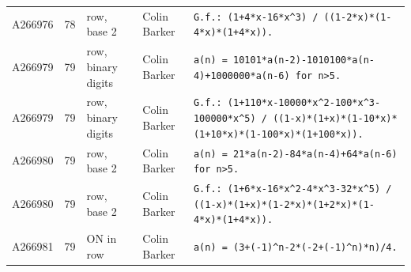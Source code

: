 \documentclass[11pt]{article}
\theoremstyle{definition}
\theoremstyle{remark}
\begin{document}
{\begin{longtable}{p{1.3cm}p{0.7cm}p{2.4cm}p{2.3cm}p{7.3cm}}
A266976 & 78 & row, base 2 & Colin Barker & \texttt{G.f.: \allowbreak{}(1+\allowbreak{}4*\allowbreak{}x-\allowbreak{}16*\allowbreak{}x\^{}3)\allowbreak{} \allowbreak{}/\allowbreak{} \allowbreak{}((1-\allowbreak{}2*\allowbreak{}x)\allowbreak{}*\allowbreak{}(1-\allowbreak{}4*\allowbreak{}x)\allowbreak{}*\allowbreak{}(1+\allowbreak{}4*\allowbreak{}x)\allowbreak{})\allowbreak{}.} \\
A266979 & 79 & row, binary digits & Colin Barker & \texttt{a(n)\allowbreak{} \allowbreak{}=\allowbreak{} \allowbreak{}10101*\allowbreak{}a(n-\allowbreak{}2)\allowbreak{}-\allowbreak{}1010100*\allowbreak{}a(n-\allowbreak{}4)\allowbreak{}+\allowbreak{}1000000*\allowbreak{}a(n-\allowbreak{}6)\allowbreak{} \allowbreak{}for \allowbreak{}n>5.} \\
A266979 & 79 & row, binary digits & Colin Barker & \texttt{G.f.: \allowbreak{}(1+\allowbreak{}110*\allowbreak{}x-\allowbreak{}10000*\allowbreak{}x\^{}2-\allowbreak{}100*\allowbreak{}x\^{}3-\allowbreak{}100000*\allowbreak{}x\^{}5)\allowbreak{} \allowbreak{}/\allowbreak{} \allowbreak{}((1-\allowbreak{}x)\allowbreak{}*\allowbreak{}(1+\allowbreak{}x)\allowbreak{}*\allowbreak{}(1-\allowbreak{}10*\allowbreak{}x)\allowbreak{}*\allowbreak{}(1+\allowbreak{}10*\allowbreak{}x)\allowbreak{}*\allowbreak{}(1-\allowbreak{}100*\allowbreak{}x)\allowbreak{}*\allowbreak{}(1+\allowbreak{}100*\allowbreak{}x)\allowbreak{})\allowbreak{}.} \\
A266980 & 79 & row, base 2 & Colin Barker & \texttt{a(n)\allowbreak{} \allowbreak{}=\allowbreak{} \allowbreak{}21*\allowbreak{}a(n-\allowbreak{}2)\allowbreak{}-\allowbreak{}84*\allowbreak{}a(n-\allowbreak{}4)\allowbreak{}+\allowbreak{}64*\allowbreak{}a(n-\allowbreak{}6)\allowbreak{} \allowbreak{}for \allowbreak{}n>5.} \\
A266980 & 79 & row, base 2 & Colin Barker & \texttt{G.f.: \allowbreak{}(1+\allowbreak{}6*\allowbreak{}x-\allowbreak{}16*\allowbreak{}x\^{}2-\allowbreak{}4*\allowbreak{}x\^{}3-\allowbreak{}32*\allowbreak{}x\^{}5)\allowbreak{} \allowbreak{}/\allowbreak{} \allowbreak{}((1-\allowbreak{}x)\allowbreak{}*\allowbreak{}(1+\allowbreak{}x)\allowbreak{}*\allowbreak{}(1-\allowbreak{}2*\allowbreak{}x)\allowbreak{}*\allowbreak{}(1+\allowbreak{}2*\allowbreak{}x)\allowbreak{}*\allowbreak{}(1-\allowbreak{}4*\allowbreak{}x)\allowbreak{}*\allowbreak{}(1+\allowbreak{}4*\allowbreak{}x)\allowbreak{})\allowbreak{}.} \\
A266981 & 79 & ON in row & Colin Barker & \texttt{a(n)\allowbreak{} \allowbreak{}=\allowbreak{} \allowbreak{}(3+\allowbreak{}(-\allowbreak{}1)\allowbreak{}\^{}n-\allowbreak{}2*\allowbreak{}(-\allowbreak{}2+\allowbreak{}(-\allowbreak{}1)\allowbreak{}\^{}n)\allowbreak{}*\allowbreak{}n)\allowbreak{}/\allowbreak{}4.} \\

\end{longtable}}
\end{document}
